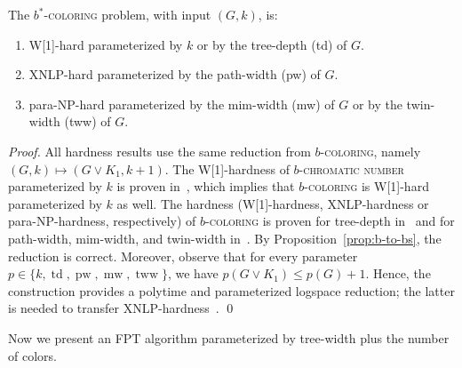 \documentclass[runningheads, envcountsame]{llncs}
\DeclareMathOperator{\td}{td}
\DeclareMathOperator{\pw}{pw}
\DeclareMathOperator{\mw}{mw}
\DeclareMathOperator{\tww}{tww}
\newcommand{\FPT}{\textsf{FPT}\xspace}
\newcommand{\XNLP}{\textsf{XNLP}\xspace}
\newcommand{\Wone}{\textsf{W[1]}\xspace}
\newcommand{\paraNP}{\textsf{para-NP}\xspace}
\newcommand{\bscoloring}{$b^*$-\textsc{coloring}\xspace}
\newcommand{\bcoloring}{$b$-\textsc{coloring}\xspace}
\newcommand{\bchromatic}{\textsc{$b$-chromatic number}\xspace}
\begin{document}
\begin{proposition}
The \bscoloring problem, with input $(G, k)$, is:
\begin{enumerate}
\item \Wone-hard parameterized by $k$ or by the tree-depth (td) of $G$.
\item \XNLP-hard parameterized by the path-width (pw) of $G$.
\item \paraNP-hard parameterized by the mim-width (mw) of $G$ or by the twin-width (tww) of $G$.
\end{enumerate}
\end{proposition}
\begin{proof}
All hardness results use the same reduction from \bcoloring, namely $(G, k) \mapsto (G \lor K_1, k+1)$.
The \Wone-hardness of \bchromatic parameterized by $k$ is proven in~\cite{DBLP:journals/jcss/PanolanPS17}, which implies that \bcoloring
is \Wone-hard parameterized by $k$ as well.
The hardness (\Wone-hardness, \XNLP-hardness or \paraNP-hardness, respectively) of \bcoloring is proven for tree-depth in~\cite{DBLP:conf/mfcs/Balaban26} and for path-width, mim-width, and twin-width in~\cite{JaffkeLS23}. 
By Proposition~\ref{prop:b-to-bs}, the reduction is correct.
Moreover, observe that for every parameter $p \in \{k, \td, \pw, \mw, \tww\}$, we have $p(G \lor K_1) \le p(G) + 1$.
Hence, the construction provides a polytime and parameterized logspace reduction; the latter is needed to transfer \XNLP-hardness~\cite{elberfeld2015space}.
\qed\end{proof}

Now we present an \FPT algorithm parameterized by tree-width plus the number of colors.
\end{document}
